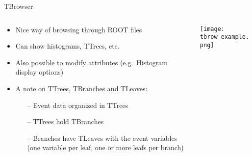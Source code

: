 \documentclass[10pt, aspectratio=169]{beamer}
\begin{document}
\begin{frame}{TBrowser}
  \begin{columns}
    \begin{column}{0.49\textwidth}
  \begin{itemize}
    \item
      Nice way of browsing through ROOT files
    \item
      Can show histograms, TTrees, etc.
    \item
      Also possible to modify attributes (e.g.~Histogram display options)
    \item
      A note on TTrees, TBranches and TLeaves:
    \begin{itemize}
      \item[--]
        Event data organized in TTrees
      \item[--]
        TTrees hold TBranches
      \item[--]
        Branches have TLeaves with the event variables (one variable per leaf, one or more leafs per branch)
    \end{itemize}
  \end{itemize}
    \end{column}
    \hfill
    \begin{column}{0.49\textwidth}
      \texttt{[image: tbrow\_example.png]}
    \end{column}
  \end{columns}
\end{frame}
\end{document}

